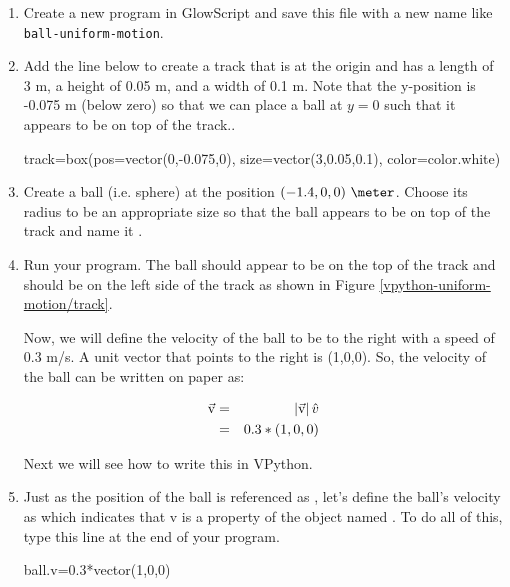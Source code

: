 \begin{enumerate}

	\item Create a new program in GlowScript and save this file with a new name like \texttt{ball-uniform-motion}.

\item Add the line below to create a track that is at the origin and has a length of 3 m, a height of 0.05 m, and a width of 0.1 m. Note that the y-position is -0.075 m (below zero) so that we can place a ball at $y=0$ such that it appears to be on top of the track..

\begin{myvpython}
track=box(pos=vector(0,-0.075,0), size=vector(3,0.05,0.1), color=color.white)
\end{myvpython}

\item Create a ball (i.e. sphere) at the position $(-1.4,0,0)\ \meter$. Choose its radius to be an appropriate size so that the ball appears to be on top of the track and name it .

\item Run your program. The ball should appear to be on the top of the track and should be on the left side of the track as shown in Figure \ref{vpython-uniform-motion/track}.


Now, we will define the velocity of the ball to be to the right with a speed of 0.3 m/s. A unit vector that points to the right is (1,0,0). So, the velocity of the ball can be written on paper as:

\begin{eqnarray*}
	\vec{\mathrm{v}} & = & \left|\vec{\mathrm{v}}\right|\hat{v} \\
	& = & 0.3*(1,0,0) 
\end{eqnarray*} 

Next we will see how to write this in VPython.

\item Just as the position of the ball is referenced as , let's define the ball's velocity as  which indicates that v is a property of the object named .  To do all of this, type this line at the end of your program.
	
\begin{myvpython}
ball.v=0.3*vector(1,0,0)
\end{myvpython}


\end{enumerate}
